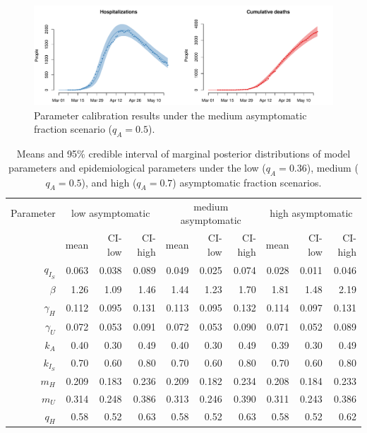 \documentclass[11pt]{article}
\begin{document}
\begin{figure} %
	\centering
	\includegraphics[width=.8\textwidth]{figures/calibration.pdf}
	\caption{Parameter calibration results under the medium asymptomatic fraction scenario ($q_A = 0.5$).}
	\label{fig:fit}
\end{figure}




\begin{table}[!htb]
	\centering
	\caption{Means and 95\% credible interval of marginal posterior distributions of model parameters and epidemiological parameters under the low ($q_A = 0.36$), medium ($q_A = 0.5$), and high ($q_A = 0.7$) asymptomatic fraction scenarios.}
	\vspace{.5em}
	\begin{tabular}{r|rrr|rrr|rrr}
		\toprule
		Parameter & \multicolumn{3}{c}{low asymptomatic} & \multicolumn{3}{c}{medium asymptomatic} & \multicolumn{3}{c}{high asymptomatic} \\
		{} & mean & CI-low & CI-high & mean & CI-low & CI-high & mean & CI-low & CI-high \\ 
		\hline
			$q_{I_S}$ & 0.063 & 0.038 & 0.089 & 0.049 & 0.025 & 0.074 & 0.028 & 0.011 & 0.046 \\ 
			$\beta$ & 1.26 & 1.09 & 1.46 & 1.44 & 1.23 & 1.70 & 1.81 & 1.48 & 2.19 \\ 
			$\gamma_H$ & 0.112 & 0.095 & 0.131 & 0.113 & 0.095 & 0.132 & 0.114 & 0.097 & 0.131 \\ 
			$\gamma_U$ & 0.072 & 0.053 & 0.091 & 0.072 & 0.053 & 0.090 & 0.071 & 0.052 & 0.089 \\ 
			$k_A$ & 0.40 & 0.30 & 0.49 & 0.40 & 0.30 & 0.49 & 0.39 & 0.30 & 0.49 \\ 
			$k_{I_S}$ & 0.70 & 0.60 & 0.80 & 0.70 & 0.60 & 0.80 & 0.70 & 0.60 & 0.80 \\ 
			$m_H$ & 0.209 & 0.183 & 0.236 & 0.209 & 0.182 & 0.234 & 0.208 & 0.184 & 0.233 \\ 
			$m_U$ & 0.314 & 0.248 & 0.386 & 0.313 & 0.246 & 0.390 & 0.311 & 0.243 & 0.386 \\ 
			$q_H$ & 0.58 & 0.52 & 0.63 & 0.58 & 0.52 & 0.63 & 0.58 & 0.52 & 0.62 \\ 

\end{tabular}
\end{table}
\end{document}
